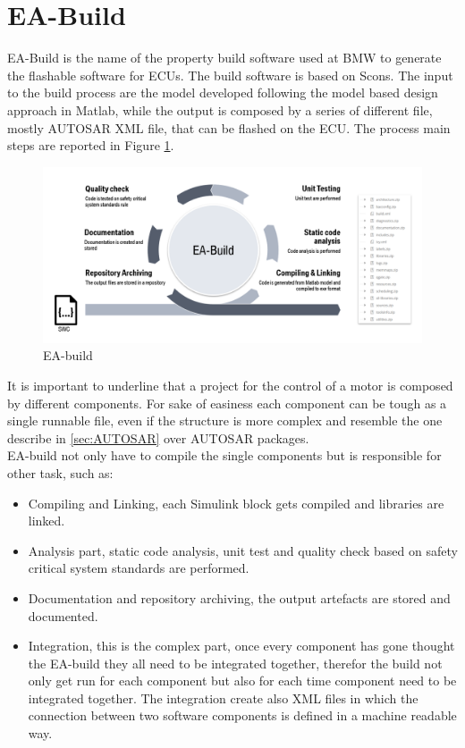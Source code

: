 \documentclass[../main.tex]{subfiles}
\begin{document}
\section{EA-Build}
\label{sec:EA-buildsection}
EA-Build is the name of the property build software used at BMW to generate the flashable software for ECUs. The build software is based on Scons. The input to the build process are the model developed following the model based design approach in Matlab, while the output is composed by a series of different file, mostly \gls{AUTOSAR} XML file, that can be flashed on the \gls{ECU}. The process main steps are reported in Figure \ref{fig:eabuild}.
\begin{figure}[h]
    \centering
    \includegraphics[width=\linewidth]{images_folder/build_proc.png}
    \caption{EA-build}
    \label{fig:eabuild}
\end{figure}
It is important to underline that a project for the control of a motor is composed by different components. For sake of easiness each component can be tough as a single runnable file, even if the structure is more complex and resemble the one describe in \ref{sec:AUTOSAR} over \gls{AUTOSAR} packages.\\
EA-build not only have to compile the single components but is responsible for other task, such as:
\begin{itemize}
    \item Compiling and Linking, each Simulink block gets compiled and libraries are linked.
    \item Analysis part, static code analysis, unit test and quality check based on safety critical system standards are performed.
    \item Documentation and repository archiving, the output artefacts are stored and documented.
    \item Integration, this is the complex part, once every component has gone thought the EA-build they all need to be integrated together, therefor the build not only get run for each component but also for each time component need to be integrated together. The integration create also XML files in which the connection between two software components is defined in a machine readable way.
\end{itemize}
\end{document}

